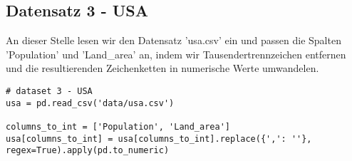 \subsection{Datensatz 3 - USA}

An dieser Stelle lesen wir den Datensatz 'usa.csv' ein und passen die Spalten 'Population' und 'Land\_area' an, indem wir Tausendertrennzeichen entfernen und die resultierenden Zeichenketten in numerische Werte umwandelen.

\begin{verbatim}
# dataset 3 - USA
usa = pd.read_csv('data/usa.csv')

columns_to_int = ['Population', 'Land_area']
usa[columns_to_int] = usa[columns_to_int].replace({',': ''}, regex=True).apply(pd.to_numeric)
\end{verbatim}